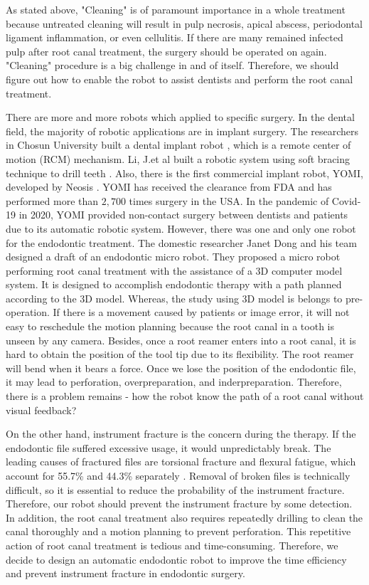 \par
As stated above, "Cleaning" is of paramount importance in a whole treatment because untreated cleaning will result in pulp necrosis, apical abscess, periodontal ligament inflammation, or even cellulitis. If there are many remained infected pulp after root canal treatment, the surgery should be operated on again. "Cleaning" procedure is a big challenge in and of itself. Therefore, we should figure out how to enable the robot to assist dentists and perform the root canal treatment.
\par
There are more and more robots which applied to specific surgery. In the dental field, the majority of robotic applications are in implant surgery. The researchers in Chosun University built a dental implant robot \cite{Kim2009ASO}, which is a remote center of motion (RCM) mechanism. Li, J.et al built a robotic system using soft bracing technique to drill teeth \cite{Li2019ACD}. Also, there is the first commercial implant robot, YOMI, developed by Neosis \cite{web3}. YOMI has received the clearance from FDA and has performed more than $2,700$ times surgery in the USA. In the pandemic of Covid-19 in 2020, YOMI provided non-contact surgery between dentists and patients due to its automatic robotic system. However, there was one and only one robot for the endodontic treatment. The domestic researcher Janet Dong and his team designed a draft of an endodontic micro robot. They proposed a micro robot performing root canal treatment with the assistance of a 3D computer model system. It is designed to accomplish endodontic therapy with a path planned according to the 3D model. Whereas, the study using 3D model is belongs to pre-operation. If there is a movement caused by patients or image error, it will not easy to reschedule the motion planning because the root canal in a tooth is unseen by any camera. Besides, once a root reamer enters into a root canal, it is hard to obtain the position of the tool tip due to its flexibility. The root reamer will bend when it bears a force. Once we lose the position of the endodontic file, it may lead to perforation, overpreparation, and inderpreparation. Therefore, there is a problem remains - how the robot know the path of a root canal without visual feedback?   
\par
On the other hand, instrument fracture is the concern during the therapy. If the endodontic file suffered excessive usage, it would unpredictably break. The leading causes of fractured files are torsional fracture and flexural fatigue, which account for 55.7\% and 44.3\% separately \cite{SATTAPAN2000161}. Removal of broken files is technically difficult, so it is essential to reduce the probability of the instrument fracture. Therefore, our robot should prevent the instrument fracture by some detection. In addition, the root canal treatment also requires repeatedly drilling to clean the canal thoroughly and a motion planning to prevent perforation. This repetitive action of root canal treatment is tedious and time-consuming. Therefore, we decide to design an automatic endodontic robot to improve the time efficiency and prevent instrument fracture in endodontic surgery.	
